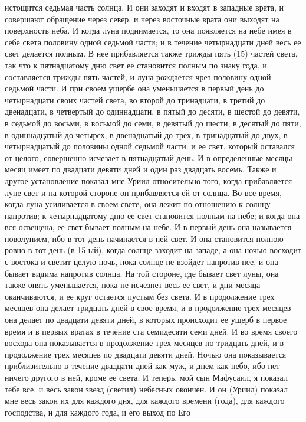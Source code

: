 истощится седьмая часть солнца.
И они заходят и входят в западные врата, и совершают обращение через
север, и через восточные врата они выходят на поверхность неба.
И когда луна поднимается, то она появляется на небе имея в себе света
половину одной седьмой части; и в течение четырнадцати дней весь ее свет
делается полным.
В нее прибавляется также трижды пять (15) частей света, так что к
пятнадцатому дню свет ее становится полным по знаку года, и составляется трижды
пять частей, и луна рождается чрез половину одной седьмой части.
И при своем ущербе она уменьшается в первый день до четырнадцати своих
частей света, во второй до тринадцати, в третий до двенадцати, в четвертый до
одиннадцати, в пятый до десяти, в шестой до девяти, в седьмой до восьми, в
восьмой до семи, в девятый до шести, в десятый до пяти, в одиннадцатый до
четырех, в двенадцатый до трех, в тринадцатый до двух, в четырнадцатый до
половины одной седьмой части: и ее свет, который оставался от целого,
совершенно исчезает в пятнадцатый день.
И в определенные месяцы месяц имеет по двадцати девяти дней и один раз
двадцать восемь.
Также и другое установление показал мне Уриил относительно того, когда
прибавляется луне свет и на которой стороне он прибавляется ей от солнца.
Во все время, когда луна усиливается в своем свете, она лежит по
отношению к солнцу напротив; к четырнадцатому дню ее свет становится полным на
небе; и когда она вся освещена, ее свет бывает полным на небе.
И в первый день она называется новолунием, ибо в тот день начинается в
ней свет.
И она становится полною ровно в тот день (в 15-ый), когда солнце
заходит на западе, а она ночью восходит с востока и светит целую ночь, пока
солнце не взойдет напротив нее, и она бывает видима напротив солнца.
На той стороне, где бывает свет луны, она также опять уменьшается,
пока не исчезнет весь ее свет, и дни месяца оканчиваются, и ее круг остается
пустым без света.
И в продолжение трех месяцев она делает тридцать дней в свое время, и
в продолжение трех месяцев она делает по двадцати девяти дней, в которых
происходит ее ущерб в первое время и в первых вратах в течение ста семидесяти
семи дней.
И во время своего восхода она показывается в продолжение трех месяцев
по тридцать дней, и в продолжение трех месяцев по двадцати девяти дней.
Ночью она показывается приблизительно в течение двадцати дней как муж,
и днем как небо, ибо нет ничего другого в ней, кроме ее света.
И теперь, мой сын Мафусаил, я показал тебе все, и весь закон
звезд (светил) небесных окончен.
И он (Уриил) показал мне весь закон их для каждого дня, для каждого
времени (года), для каждого господства, и для каждого года, и его выход по Его
